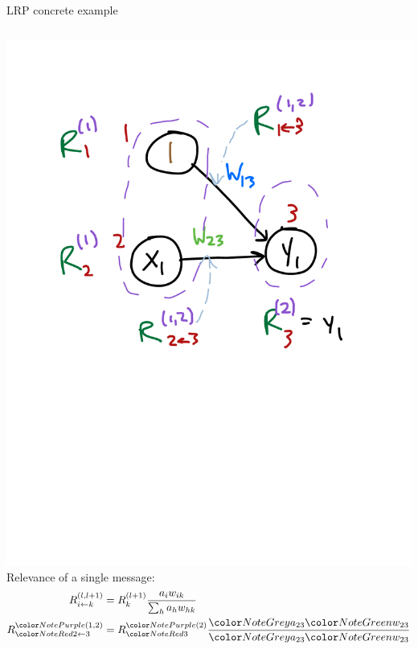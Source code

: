 \documentclass[compress]{beamer}
\makeatletter
\def\mathcolor#1#{\@mathcolor{#1}}
\def\@mathcolor#1#2#3{%
  \protect\leavevmode
  \begingroup
    \color#1{#2}#3%
  \endgroup
}
\makeatother
\begin{document}
\begin{frame}{LRP concrete example}
  \begin{columns}
    \begin{column}{0.5\textwidth}
      \includegraphics[width=1.0\textwidth]{./figures/lr_nn_6.pdf} \\
      Relevance of a single message:
      \begin{align*}
        R_{i \leftarrow k}^{(l,l+1)} &= R_{k}^{(l+1)} \frac{a_{i} w_{ik}}{\sum_{h} a_{h} w_{hk}} \\
        R_{\mathcolor{NoteRed}{2 \leftarrow 3}}^{\mathcolor{NotePurple}{(1,2)}} &= R_{\mathcolor{NoteRed}{3}}^{\mathcolor{NotePurple}{(2)}} \frac{\mathcolor{NoteGrey}{a_{23}} \mathcolor{NoteGreen}{w_{23}}}{\mathcolor{NoteGrey}{a_{23}} \mathcolor{NoteGreen}{w_{23}}}

\end{align*}
\end{column}
\end{columns}
\end{frame}
\end{document}
